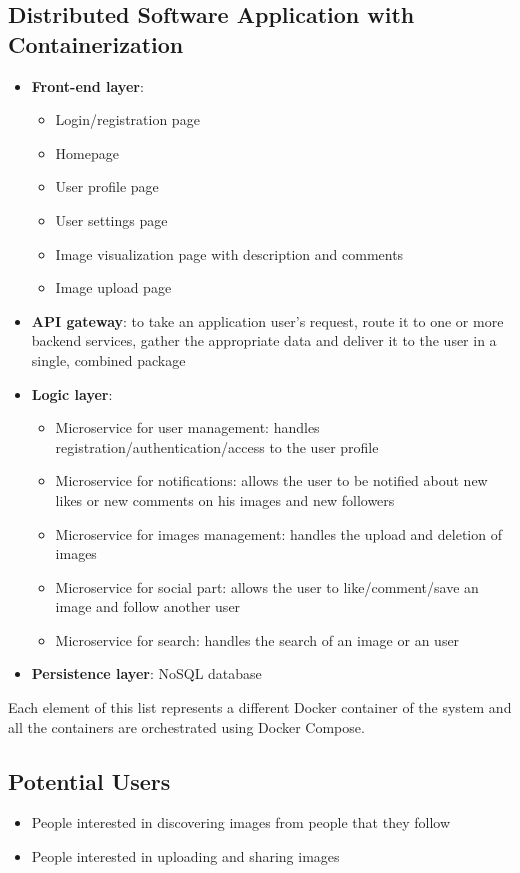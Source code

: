 \documentclass[11pt, a4paper]{article}
\begin{document}
\subsection{Distributed Software Application with Containerization}
\begin{itemize}
    \item \textbf{Front-end layer}:
    \begin{itemize}
     \item Login/registration page
     \item Homepage
     \item User profile page
     \item User settings page
     \item Image visualization page with description and comments
     \item Image upload page
    \end{itemize}
    \item \textbf{API gateway}: to take an application user's request, route it to one or more backend services, gather the appropriate data and deliver it to the user in a single, combined package    
    \item \textbf{Logic layer}: 
    \begin{itemize}
     \item Microservice for user management: handles registration/authentication/access to the user profile
     \item Microservice for notifications: allows the user to be notified about new likes or new comments on his images and new followers
     \item Microservice for images management: handles the upload and deletion of images
     \item Microservice for social part: allows the user to like/comment/save an image and follow another user
     \item Microservice for search: handles the search of an image or an user
    \end{itemize}
    \item \textbf{Persistence layer}: NoSQL database
\end{itemize}
Each element of this list represents a different Docker container of the system and all the containers are orchestrated using Docker Compose.

\subsection{Potential Users}
\begin{itemize}
    \item People interested in discovering images from people that they follow
    \item People interested in uploading and sharing images
\end{itemize}
\end{document}
